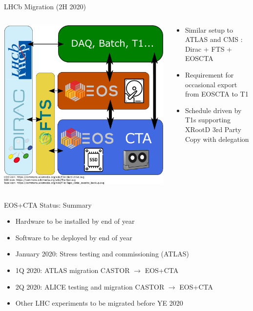 \documentclass[aspectratio=1610]{beamer}
\begin{document}
\begin{frame}{LHCb Migration (2H 2020)}
\begin{columns}
	\begin{column}{0.4\textwidth}
		\begin{center}
		  \includegraphics[width=\textwidth]{images/CTA_Deployment_LHCb.pdf}
		\end{center}
	\end{column}
	\begin{column}{0.55\textwidth}
		\begin{itemize}
		  \item Similar setup to ATLAS and CMS : Dirac + FTS + EOSCTA
		  \item Requirement for occasional export from EOSCTA to T1
        \item Schedule driven by T1s supporting XRootD 3rd Party Copy with delegation
		\end{itemize}
	\end{column}
\end{columns}
\end{frame}

\begin{frame}{EOS+CTA Status: Summary}
\begin{itemize}
    \item Hardware to be installed by end of year
    \item Software to be deployed by end of year
    \item January 2020: Stress testing and commissioning (ATLAS)
    \item 1Q 2020: ATLAS migration CASTOR $\rightarrow$ EOS+CTA
    \item 2Q 2020: ALICE testing and migration CASTOR $\rightarrow$ EOS+CTA
    \item Other LHC experiments to be migrated before YE 2020
\end{itemize}
\end{frame}

\backcover
\end{document}
